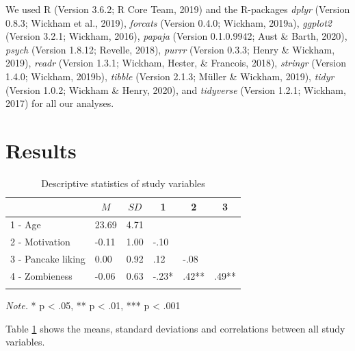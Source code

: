 \documentclass[english,man]{apa6}
\begin{document}
We used R (Version 3.6.2; R Core Team, 2019) and the R-packages \emph{dplyr} (Version 0.8.3; Wickham et al., 2019), \emph{forcats} (Version 0.4.0; Wickham, 2019a), \emph{ggplot2} (Version 3.2.1; Wickham, 2016), \emph{papaja} (Version 0.1.0.9942; Aust \& Barth, 2020), \emph{psych} (Version 1.8.12; Revelle, 2018), \emph{purrr} (Version 0.3.3; Henry \& Wickham, 2019), \emph{readr} (Version 1.3.1; Wickham, Hester, \& Francois, 2018), \emph{stringr} (Version 1.4.0; Wickham, 2019b), \emph{tibble} (Version 2.1.3; Müller \& Wickham, 2019), \emph{tidyr} (Version 1.0.2; Wickham \& Henry, 2020), and \emph{tidyverse} (Version 1.2.1; Wickham, 2017) for all our analyses.

\hypertarget{results}{%
\section{Results}\label{results}}

\begin{table}[tbp]

\begin{center}
\begin{threeparttable}

\caption{\label{tab:descriptivestable}Descriptive statistics of study variables}

\begin{tabular}{llllll}
\toprule
 & \multicolumn{1}{c}{$M$} & \multicolumn{1}{c}{$SD$} & \multicolumn{1}{c}{1} & \multicolumn{1}{c}{2} & \multicolumn{1}{c}{3}\\
\midrule
1 - Age & 23.69 & 4.71 &  &  & \\
2 - Motivation & -0.11 & 1.00 & -.10 &  & \\
3 - Pancake liking & 0.00 & 0.92 & .12 & -.08 & \\
4 - Zombieness & -0.06 & 0.63 & -.23* & .42** & .49**\\
\bottomrule
\addlinespace
\end{tabular}

\begin{tablenotes}[para]
\normalsize{\textit{Note.} * p < .05, ** p < .01, *** p < .001}
\end{tablenotes}

\end{threeparttable}
\end{center}

\end{table}

Table \ref{tab:descriptivestable} shows the means, standard deviations and correlations between all study variables.
\end{document}
